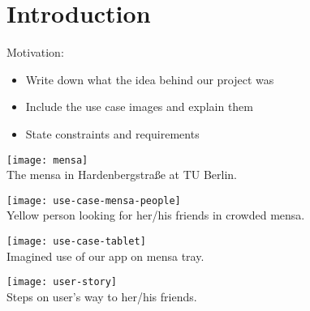 \chapter{Introduction}
\label{cha:introduction}

Motivation:
\begin{itemize}
    \item Write down what the idea behind our project was
    \item Include the use case images and explain them
    \item State constraints and requirements
\end{itemize}


\begin{center}
    \texttt{[image: mensa]}\\
    The mensa in Hardenbergstraße at TU Berlin.
\end{center}

\begin{center}
    \texttt{[image: use-case-mensa-people]}\\
    Yellow person looking for her/his friends in crowded mensa.
\end{center}

\begin{center}
    \texttt{[image: use-case-tablet]}\\
    Imagined use of our app on mensa tray.
\end{center}

\begin{center}
    \texttt{[image: user-story]}\\
    Steps on user's way to her/his friends.
\end{center}